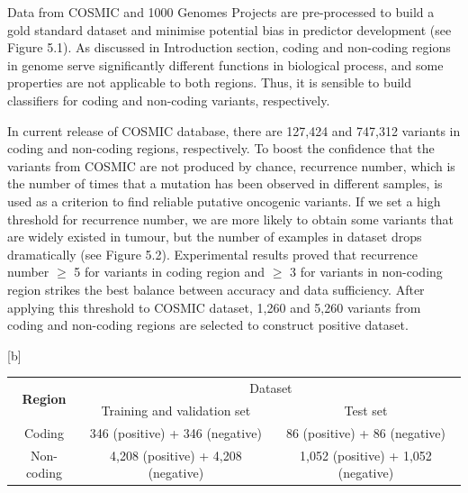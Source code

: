 \documentclass[a4paper,nohyper,nobib,openany,justified]{tufte-book}
\makeatletter
\renewenvironment{table}[1][htbp]{%
  \@tufte@orig@float{table}[#1]%
}{%
  \@tufte@orig@endfloat
}
\makeatother
\begin{document}
\begin{fullwidth}
Data from COSMIC and 1000 Genomes Projects are pre-processed to build a gold standard dataset and minimise potential bias in predictor development (see Figure 5.1). As discussed in Introduction section, coding and non-coding regions in genome serve significantly different functions in biological process, and some properties are not applicable to both regions. Thus, it is sensible to build classifiers for coding and non-coding variants, respectively.

In current release of COSMIC database, there are 127,424 and 747,312 variants in coding and non-coding regions, respectively. To boost the confidence that the variants from COSMIC are not produced by chance, recurrence number, which is the number of times that a mutation has been observed in different samples, is used as a criterion to find reliable putative oncogenic variants. If we set a high threshold for recurrence number, we are more likely to obtain some variants that are widely existed in tumour, but the number of examples in dataset drops dramatically (see Figure 5.2). Experimental results proved that recurrence number $\geqslant$ 5 for variants in coding region and $\geqslant$ 3 for variants in non-coding region strikes the best balance between accuracy and data sufficiency. After applying this threshold to COSMIC dataset, 1,260 and 5,260 variants from coding and non-coding regions are selected to construct positive dataset.

\begin{table}[b]
        \begin{center}
        \begin{tabular}{ccc}
        \toprule
         \multirow{2}{*}{\textbf{Region}} & \multicolumn{2}{c}{Dataset} \\
        \cmidrule(l){2-3}
         & Training and validation set & Test set \\
        \midrule
    Coding     & 346 (positive) + 346 (negative)     & 86 (positive) + 86 (negative)     \\
    Non-coding & 4,208 (positive) + 4,208 (negative) & 1,052 (positive) + 1,052 (negative)  \\
        \bottomrule
        \end{tabular}
        \end{center}
    \caption{Overview of datasets used in this study}
    \label{tab:dataset}
\end{table}


\end{fullwidth}
\end{document}
